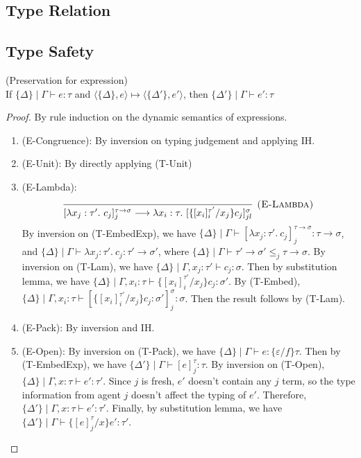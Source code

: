 \subsection{Type Relation}

\subsection{Type Safety}
\begin{lemma} (Preservation for expression)\\
If $\{\Delta\} \mid \Gamma \vdash e : \tau$ and $\langle \{\Delta\}, e\rangle \mapsto \langle \{\Delta'\}, e'\rangle$, then $\{\Delta'\} \mid \Gamma \vdash e' : \tau$
\begin{proof}
By rule induction on the dynamic semantics of expressions. 
\begin{enumerate}
\item (E-Congruence): By inversion on typing judgement and applying IH.
\item (E-Unit): By directly applying (T-Unit)
\item (E-Lambda): 
$$\infer[\textsc{(E-Lambda)}]
  {[\lambda x_j : \tau'.\ c_j]^{\tau \rightarrow \sigma}_{j} \longrightarrow \lambda x_i : \tau.\ [\{[x_i]^{\tau'}_{i}/x_j\}c_j]^\sigma_{jl}}
  {}$$
By inversion on (T-EmbedExp), we have $\{\Delta\} \mid \Gamma \vdash  [\lambda x_j : \tau'.\ c_j]^{\tau \rightarrow \sigma}_{j}: \tau \rightarrow \sigma$, and $\{\Delta\} \mid \Gamma \vdash \lambda x_j : \tau'.\ c_j : \tau' \rightarrow \sigma'$, where $\{\Delta\} \mid \Gamma \vdash \tau' \rightarrow \sigma' \leq_j \tau \rightarrow \sigma$. By inversion on (T-Lam), we have $\{\Delta\} \mid \Gamma, x_j : \tau' \vdash c_j : \sigma$. Then by substitution lemma, we have $\{\Delta\} \mid \Gamma, x_i : \tau  \vdash \{[x_i]^{\tau'}_i/x_j\}c_j : \sigma'$. By (T-Embed), 
$\{\Delta\} \mid \Gamma, x_i : \tau  \vdash [\{[x_i]^{\tau'}_i/x_j\}c_j : \sigma']^{\sigma}_j : \sigma$. Then the result follows by (T-Lam).

\item (E-Pack): By inversion and IH.
\item (E-Open): By inversion on (T-Pack), we have $\{\Delta\} \mid \Gamma \vdash e : \{\varepsilon /f\} \tau$. Then by (T-EmbedExp), we have $\{\Delta'\} \mid \Gamma \vdash [e]^\tau_j : \tau$. By inversion on (T-Open), $\{\Delta\} \mid \Gamma, x : \tau \vdash e' : \tau'$. Since $j$ is fresh, $e'$ doesn't contain any $j$ term, so the type information from agent $j$ doesn't affect the typing of $e'$. Therefore, $\{\Delta'\} \mid \Gamma, x : \tau \vdash e' : \tau'$. Finally, by substitution lemma, we have $\{\Delta'\} \mid \Gamma \vdash \{[e]^\tau_j / x \}e' : \tau'$.


\end{enumerate}
\end{proof}
\end{lemma}
